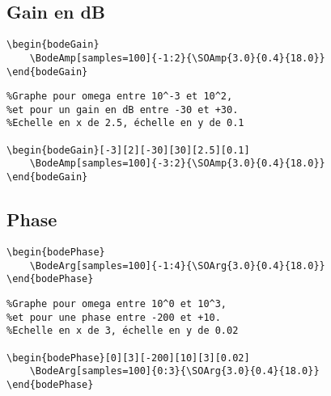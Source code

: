 \documentclass[a4paper,12pt]{article}
\begin{document}
	
	\subsection{Gain en dB}
	
	\begin{verbatim}
\begin{bodeGain}
	\BodeAmp[samples=100]{-1:2}{\SOAmp{3.0}{0.4}{18.0}}
\end{bodeGain}
	\end{verbatim}

\begin{bodeGain}
\end{bodeGain}

	\begin{verbatim}
%Graphe pour omega entre 10^-3 et 10^2,
%et pour un gain en dB entre -30 et +30.
%Echelle en x de 2.5, échelle en y de 0.1

\begin{bodeGain}[-3][2][-30][30][2.5][0.1]
	\BodeAmp[samples=100]{-3:2}{\SOAmp{3.0}{0.4}{18.0}}
\end{bodeGain}
	\end{verbatim}

\begin{bodeGain}[-3][2][-30][30][2.5][0.1]
\end{bodeGain}


	\subsection{Phase}

	\begin{verbatim}
\begin{bodePhase}
	\BodeArg[samples=100]{-1:4}{\SOArg{3.0}{0.4}{18.0}}
\end{bodePhase}
	\end{verbatim}

\begin{bodePhase}
\end{bodePhase}

	\begin{verbatim}
%Graphe pour omega entre 10^0 et 10^3,
%et pour une phase entre -200 et +10.
%Echelle en x de 3, échelle en y de 0.02

\begin{bodePhase}[0][3][-200][10][3][0.02]
	\BodeArg[samples=100]{0:3}{\SOArg{3.0}{0.4}{18.0}}
\end{bodePhase}
	\end{verbatim}

\begin{bodePhase}[0][3][-200][10][3][0.02]
\end{bodePhase}
\end{document}
